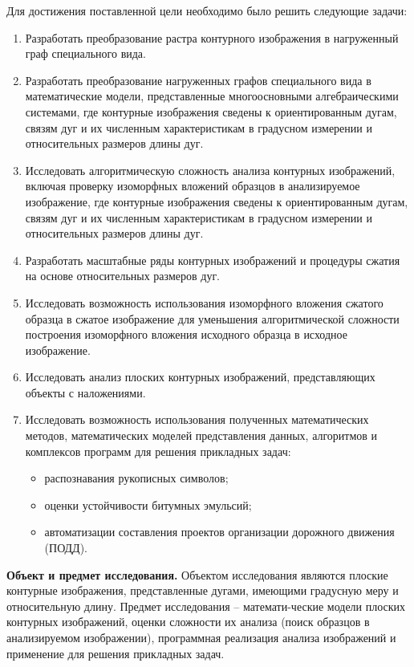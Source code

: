 Для достижения поставленной цели необходимо было решить следующие задачи:	
\begin{enumerate}
\item Разработать преобразование растра контурного изображения в нагруженный граф специального вида.
\item Разработать преобразование нагруженных графов специального вида в математические модели, представленные многоосновными алгебраическими системами, где контурные изображения сведены к ориентированным дугам, связям дуг и их численным характеристикам в градусном измерении и  относительных размеров  длины дуг.
\item Исследовать алгоритмическую сложность  анализа контурных изображений, включая проверку изоморфных вложений образцов в анализируемое изображение, где контурные изображения сведены к ориентированным дугам, связям дуг и их численным характеристикам в градусном измерении и  относительных размеров  длины дуг.
\item Разработать  масштабные ряды контурных изображений и процедуры сжатия на  основе относительных размеров дуг.
\item Исследовать возможность использования  изоморфного вложения сжатого образца в сжатое изображение для уменьшения алгоритмической сложности построения  изоморфного вложения исходного образца в исходное изображение.
\item Исследовать анализ плоских контурных изображений, представляющих объекты с наложениями.
\item Исследовать возможность использования полученных математических методов, математических моделей представления данных, алгоритмов и комплексов программ для решения прикладных задач:
\begin{itemize}
   \item распознавания рукописных символов;
   \item  оценки устойчивости битумных эмульсий;
   \item  автоматизации составления проектов организации дорожного движения (ПОДД). 
\end{itemize}
\end{enumerate}

\textbf{Объект и предмет исследования.}  Объектом исследования являются плоские контурные изображения, представленные дугами, имеющими градусную меру и относительную длину. Предмет исследования – математи-ческие модели плоских контурных изображений, оценки сложности их анализа (поиск образцов в анализируемом изображении), программная реализация анализа изображений и применение для решения прикладных задач. 
	
